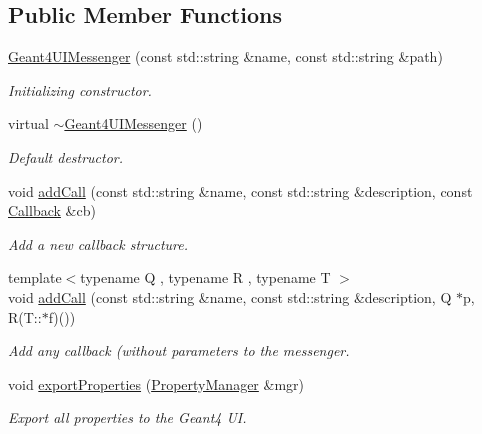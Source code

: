 \subsection*{Public Member Functions}
\begin{DoxyCompactItemize}
\item 
\hyperlink{class_d_d4hep_1_1_simulation_1_1_geant4_u_i_messenger_a82be43ebe3c90a3e1d6887aaa20d3196}{Geant4UIMessenger} (const std::string \&name, const std::string \&path)
\begin{DoxyCompactList}\small\item\em Initializing constructor. \item\end{DoxyCompactList}\item 
virtual \hyperlink{class_d_d4hep_1_1_simulation_1_1_geant4_u_i_messenger_aad6ad70233b8f95d1cdd09661ad0d510}{$\sim$Geant4UIMessenger} ()
\begin{DoxyCompactList}\small\item\em Default destructor. \item\end{DoxyCompactList}\item 
void \hyperlink{class_d_d4hep_1_1_simulation_1_1_geant4_u_i_messenger_a42b963fb8d55b8fa2f1586098b383d61}{addCall} (const std::string \&name, const std::string \&description, const \hyperlink{class_d_d4hep_1_1_callback}{Callback} \&cb)
\begin{DoxyCompactList}\small\item\em Add a new callback structure. \item\end{DoxyCompactList}\item 
{\footnotesize template$<$typename Q , typename R , typename T $>$ }\\void \hyperlink{class_d_d4hep_1_1_simulation_1_1_geant4_u_i_messenger_afebec6761b3606236fca98853df29eec}{addCall} (const std::string \&name, const std::string \&description, Q $\ast$p, R(T::$\ast$f)())
\begin{DoxyCompactList}\small\item\em Add any callback (without parameters to the messenger. \item\end{DoxyCompactList}\item 
void \hyperlink{class_d_d4hep_1_1_simulation_1_1_geant4_u_i_messenger_accdcb3b4978b3ed83c400ca7e6ced993}{exportProperties} (\hyperlink{class_d_d4hep_1_1_property_manager}{PropertyManager} \&mgr)
\begin{DoxyCompactList}\small\item\em Export all properties to the Geant4 UI. \item\end{DoxyCompactList}\item 

\end{DoxyCompactItemize}
